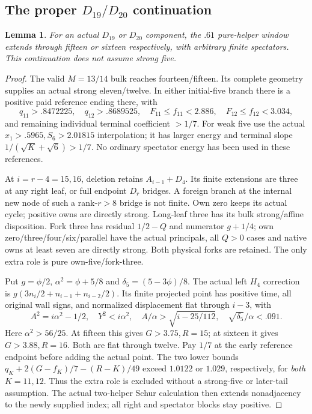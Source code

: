 \documentclass[11pt]{article}
\newtheorem{lemma}[theorem]{Lemma}
\theoremstyle{definition}
\theoremstyle{remark}
\begin{document}
\subsection{The proper $D_{19}/D_{20}$ continuation}
\label{app:tail:properD1920}
\begin{lemma}
\label{app:tail:lem:D4proper}
For an actual $D_{19}$ or $D_{20}$ component, the $.61$ pure-helper
window extends through fifteen or sixteen respectively, with arbitrary
finite spectators. This continuation does not assume strong five.
\end{lemma}
\begin{proof}
The valid $M=13/14$ bulk reaches fourteen/fifteen. Its complete
geometry supplies an actual strong eleven/twelve. In either initial-five
branch there is a positive paid reference ending there, with
\[
 q_{11}>.8472225,\quad q_{12}>.8689525,\quad
 F_{11}\le f_{11}<2.886,\quad F_{12}\le f_{12}<3.034,
\]
and remaining individual terminal coefficient $>1/7$.
For weak five use the actual $x_1>.5965,S_6>2.01815$ interpolation;
it has larger energy and terminal slope $1/(\sqrt K+\sqrt6)>1/7$.
No ordinary spectator energy has been used in these references.

At $i=r-4=15,16$, deletion retains $A_{i-1}+D_4$.
Its finite extensions are three at any right leaf, or full endpoint
$D_r$ bridges. A foreign branch at the internal new node of such a
rank-$r>8$ bridge is not finite. Own zero keeps its actual cycle;
positive owns are directly strong. Long-leaf three has its bulk
strong/affine disposition. Fork three has residual $1/2-Q$ and
numerator $g+1/4$; own zero/three/four/six/parallel have the actual
principals, all $Q>0$ cases and native owns at least seven are
directly strong. Both physical forks are retained. The only extra
role is pure own-five/fork-three.

Put $g=\phi/2$, $\alpha^2=\phi+5/8$ and
$\delta_5=(5-3\phi)/8$. The actual left $H_4$ correction is
$g(3n_i/2+n_{i-1}+n_{i-2}/2)$. Its finite projected point has
positive time, all original wall signs, and normalized displacement
flat through $i-3$, with
\[
 A^2=i\alpha^2-1/2,\quad Y^2<i\alpha^2,\quad
 A/\alpha>\sqrt{i-25/112},\quad
 \sqrt{\delta_5}/\alpha<.091.
\]
Here $\alpha^2>56/25$. At fifteen this gives $G>3.75,R=15$;
at sixteen it gives $G>3.88,R=16$. Both are flat through twelve.
Pay $1/7$ at the early reference endpoint before adding the actual
point. The two lower bounds
$q_K+2(G-f_K)/7-(R-K)/49$ exceed $1.0122$ or $1.029$,
respectively, for \emph{both} $K=11,12$. Thus the extra role is
excluded without a strong-five or later-tail assumption.
The actual two-helper Schur calculation then extends nonadjacency
to the newly supplied index; all right and spectator blocks stay positive.
\end{proof}
\end{document}
